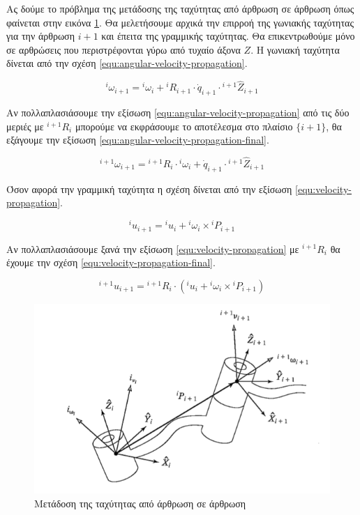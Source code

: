 Ας δούμε το πρόβλημα της μετάδοσης της ταχύτητας από άρθρωση σε άρθρωση όπως φαίνεται στην εικόνα \ref{fig:velocity-transfer}. Θα μελετήσουμε αρχικά την επιρροή της γωνιακής ταχύτητας για την άρθρωση $i+1$ και έπειτα της γραμμικής ταχύτητας. Θα επικεντρωθούμε μόνο σε αρθρώσεις που περιστρέφονται γύρω από τυχαίο άξονα $Ζ$. Η γωνιακή ταχύτητα δίνεται από την σχέση \ref{equ:angular-velocity-propagation}.

\begin{equation}
    ^i\omega_{i+1} = {}^i\omega_i + {}^iR_{i+1} \cdot \dot{q}_{i+1}
    \cdot {}^{i+1}\hat{Z}_{i+1}
    \label{equ:angular-velocity-propagation}
\end{equation}

Αν πολλαπλασιάσουμε την εξίσωση \ref{equ:angular-velocity-propagation} από τις δύο μεριές με $^{i+1}R_i$ μπορούμε να εκφράσουμε το αποτέλεσμα στο πλαίσιο $\{i+1\}$, θα εξάγουμε την εξίσωση \ref{equ:angular-velocity-propagation-final}.

\begin{equation}
    ^{i+1}\omega_{i+1} = {}^{i+1}R_i \cdot {}^i\omega_i + \dot{q}_{i+1}
    \cdot {}^{i+1}\hat{Z}_{i+1}
    \label{equ:angular-velocity-propagation-final}
\end{equation}

Όσον αφορά την γραμμική ταχύτητα η σχέση δίνεται από την εξίσωση \ref{equ:velocity-propagation}.

\begin{equation}
    ^iu_{i+1} = {}^iu_i + {}^i\omega_i \times {}^iP_{i+1}
    \label{equ:velocity-propagation}
\end{equation}

Αν πολλαπλασιάσουμε ξανά την εξίσωση \ref{equ:velocity-propagation} με $^{i+1}R_i$ θα έχουμε την σχέση \ref{equ:velocity-propagation-final}.

\begin{equation}
    ^{i+1}u_{i+1} = {}^{i+1}R_i \cdot (^iu_i + {}^i\omega_i \times
    {}^iP_{i+1})
    \label{equ:velocity-propagation-final}
\end{equation}

\begin{figure}[H]
    \centering
    \includegraphics[width=.8\textwidth]{rigidbody/fig/velocity-transfer.png}
    \caption{Μετάδοση της ταχύτητας από άρθρωση σε άρθρωση\cite{craig95}}
    \label{fig:velocity-transfer}
\end{figure}

